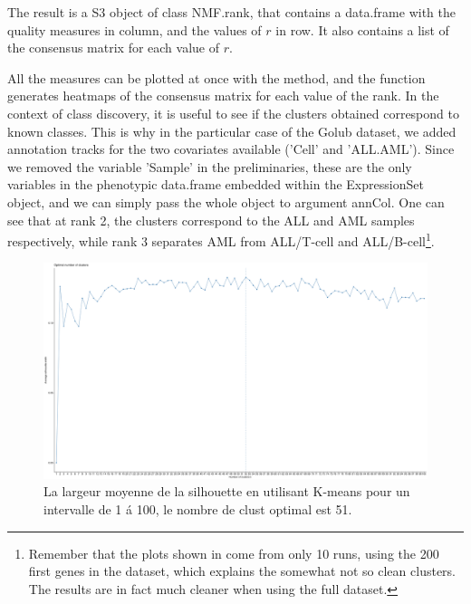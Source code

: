 \documentclass[runningheads]{llncs}
\begin{document}
The result is a S3 object of class NMF.rank, that contains a data.frame with the quality measures in column, and the values of $r$ in row.
It also contains a list of the consensus matrix for each value of $r$.

All the measures can be plotted at once with the method, and the function generates heatmaps of the consensus matrix for each value of the rank.
In the context of class discovery, it is useful to see if the clusters obtained correspond to known classes.
This is why in the particular case of the Golub dataset, we added annotation tracks for the two covariates available ('Cell' and 'ALL.AML').
Since we removed the variable 'Sample' in the preliminaries, these are the only variables in the phenotypic data.frame embedded within the ExpressionSet object, and we can simply pass the whole object to argument annCol.
One can see that at rank 2, the clusters correspond to the ALL and AML samples respectively, while rank 3 separates AML from ALL/T-cell and ALL/B-cell\footnote{Remember that the plots shown in come from only 10 runs, using the 200 first genes in the dataset, which explains the somewhat not so clean clusters.
The results are in fact much cleaner when using the full dataset.}.

\begin{figure}
\includegraphics[width=\textwidth]{x16_k_greyscale.png}
\caption{La largeur moyenne de la silhouette en utilisant K-means pour un intervalle de 1 \'a 100, le nombre de clust optimal est 51.} \label{fig1}
\end{figure}
\end{document}
